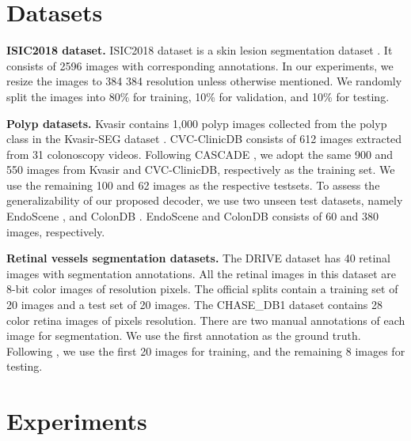 \documentclass[10pt,twocolumn,letterpaper]{article}
\begin{document}
\section{Datasets}

\textbf{ISIC2018 dataset.}
ISIC2018 dataset is a skin lesion segmentation dataset \cite{codella2019skin}. It consists of 2596 images with corresponding annotations. In our experiments, we resize the images to 384  384 resolution unless otherwise mentioned. We randomly split the images into 80\% for training, 10\% for validation,
and 10\% for testing.

\textbf{Polyp datasets.} Kvasir contains 1,000 polyp images collected from the polyp class in the Kvasir-SEG dataset \cite{jha2020kvasir}. CVC-ClinicDB \cite{bernal2015wm} consists of 612 images extracted from 31 colonoscopy videos.  Following CASCADE \cite{Rahman_2023_WACV}, we adopt the same 900 and 550 images from Kvasir and CVC-ClinicDB, respectively as the training set. We use the remaining 100 and 62 images as the respective testsets. To assess the generalizability of our proposed decoder, we use two unseen test datasets, namely EndoScene \cite{vazquez2017benchmark}, and ColonDB \cite{tajbakhsh2015automated}. EndoScene and ColonDB consists of 60 and 380 images, respectively.

\color{black}

\textbf{Retinal vessels segmentation datasets.} The DRIVE \cite{staal2004ridge} dataset has 40 retinal images with segmentation annotations. All the retinal images in this dataset are 8-bit color images of resolution  pixels. The official splits contain a training set of 20 images and a test set of 20 images. The CHASE\_DB1 \cite{carballal2018automatic} dataset contains 28 color retina images of  pixels resolution. There are two manual annotations of each image for segmentation. We use the first annotation as the ground truth. Following \cite{liu2022full}, we use the first 20 images for training, and the remaining 8 images for testing.

\color{black}

\section{Experiments}
\label{asec:experiments}

\color{black}
\end{document}
